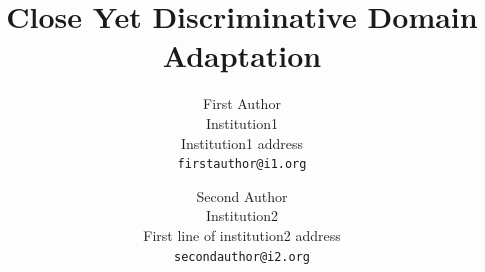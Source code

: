 \documentclass[10pt,twocolumn,letterpaper]{article}
\begin{document}
\begin{CJK*}{UTF8}{gkai}
\title{Close Yet Discriminative Domain Adaptation}

\author{First Author\\
Institution1\\
Institution1 address\\
{\tt\small firstauthor@i1.org}
\and
Second Author\\
Institution2\\
First line of institution2 address\\
{\tt\small secondauthor@i2.org}
}

\maketitle






\end{CJK*}
\end{document}
